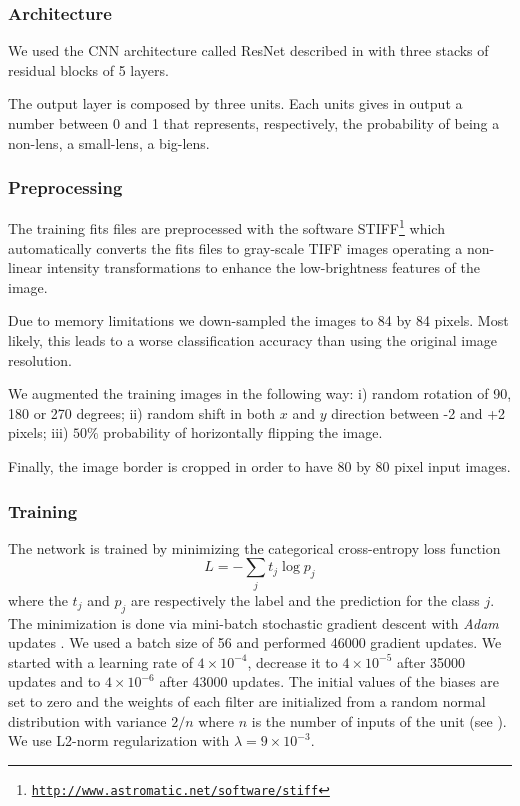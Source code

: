 \documentclass[useAMS,usenatbib]{mnras}
\begin{document}
\subsubsection{Architecture}
We used the CNN architecture called ResNet described in \citep{he2015deep} with three stacks of residual blocks of 5 layers. 

The output layer is composed by three units. Each units gives in output a number between 0 and 1 that represents, respectively, the probability of being a non-lens, a small-lens, a big-lens.

\subsubsection{Preprocessing}
The training fits files are preprocessed with the software \textsc{STIFF}\footnote{\href{http://www.astromatic.net/software/stiff}{\tt http://www.astromatic.net/software/stiff}} which automatically converts the fits files to gray-scale TIFF images operating a non-linear intensity transformations to enhance the low-brightness features of the image.   

Due to memory limitations we down-sampled the images to 84 by 84 pixels. Most likely, this leads to a worse classification accuracy than using the original image resolution.

We augmented the training images in the following way: i) random rotation of 90, 180 or 270 degrees; ii) random shift in both $x$ and $y$ direction between -2 and +2 pixels; iii) $50\%$ probability of horizontally flipping the image. 

Finally, the image border is cropped in order to have 80 by 80 pixel input images.

\subsubsection{Training}
The network is trained by minimizing the categorical cross-entropy loss function
\begin{equation}
L = -\sum_j t_{j}\log p_{j}
\label{EQloss}
\end{equation}
where the $t_j$ and $p_j$ are respectively the label and the prediction for the class $j$. 
The minimization is done via mini-batch stochastic gradient descent with \textit{Adam} updates \citep{Kingma_2014}. We used a batch size of 56 and performed  46000 gradient updates. We started with a learning rate of $4 \times 10^{-4}$, decrease it to $4 \times 10^{-5}$ after 35000 updates and to $4 \times 10^{-6}$ after 43000 updates.
The initial values of the biases are set to zero and the weights of each filter are initialized from a random normal distribution with variance ${2/n}$ where $n$ is the number of inputs of the unit (see \citep{he2015delving}).  
We use L2-norm regularization with $\lambda= 9 \times 10^{-3}$.
\end{document}
